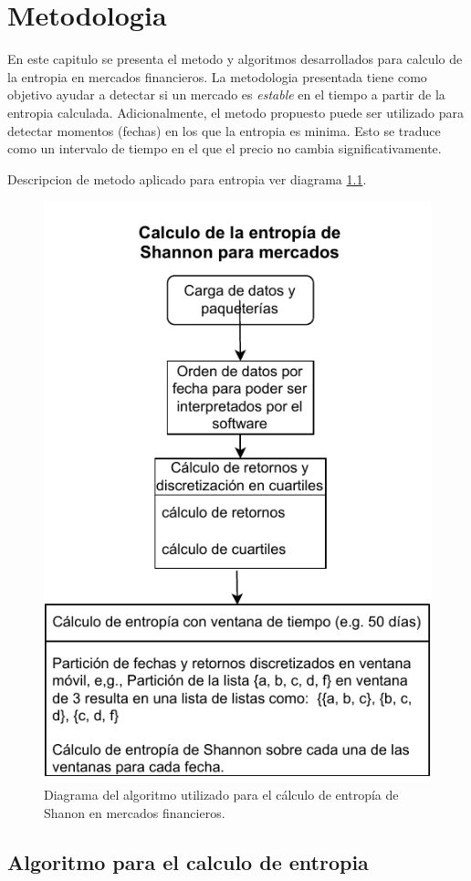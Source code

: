 %
\chapter{Metodologia}
\label{Metodologia}

En este capitulo se presenta el metodo y algoritmos desarrollados para calculo de la entropia en mercados financieros.
La metodologia presentada tiene como objetivo ayudar a detectar si un mercado es \textit{estable} en el tiempo a partir de la entropia calculada.
Adicionalmente, el metodo propuesto puede ser utilizado para detectar momentos (fechas) en los que la entropia es minima. 
Esto se traduce como un intervalo de tiempo en el que el precio no cambia significativamente.


Descripcion de metodo aplicado para entropia  ver diagrama \ref{diagramaentropia1}.

\begin{figure}[h]
	\centering
	\includegraphics[width=0.7\linewidth]{figures/diagrama_entropia1}
	\caption{Diagrama del algoritmo utilizado para el c\'alculo de entrop\'ia de Shanon en mercados financieros.}
	\label{diagramaentropia1}
\end{figure}


\section{Algoritmo para el calculo de entropia}


